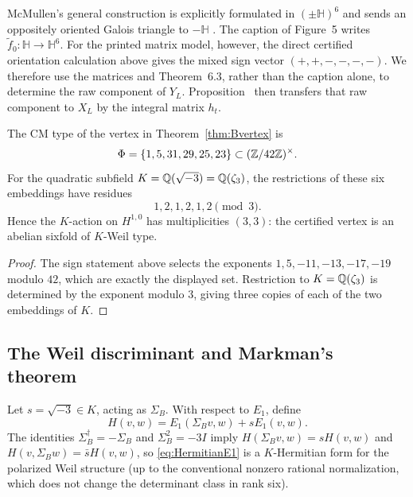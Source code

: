 \begin{remark}\label{rem:fig5signs}
McMullen's general construction is explicitly formulated in
$(\pm\mathbb H)^6$ and sends an oppositely oriented Galois triangle to
$-\mathbb H$ \cite[Thm.~6.3, Eq.~(6.1)]{McMullen2026}.  The caption of Figure~5
writes $\widetilde f_0:\mathbb H\to\mathbb H^6$.  For the printed matrix model,
however, the direct certified orientation calculation above gives the mixed sign vector
$(+,+,-,-,-,-)$.  We therefore use the matrices and Theorem~6.3, rather than the
caption alone, to determine the raw component of $Y_L$.  Proposition~
then transfers that raw component to $X_L$ by the integral matrix $h_t$.
\end{remark}

\begin{proposition}\label{prop:actualcmtype}
The CM type of the vertex in Theorem~\ref{thm:Bvertex} is
\[
 \Phi=\{1,5,31,29,25,23\}\subset (\mathbb Z/42\mathbb Z)^\times.
\]
For the quadratic subfield $K=\mathbb Q(\sqrt{-3})=\mathbb Q(\zeta_3)$, the restrictions of these six embeddings have residues
\[
 1,2,1,2,1,2\pmod 3.
\]
Hence the $K$-action on $H^{1,0}$ has multiplicities $(3,3)$: the certified vertex is an abelian sixfold of $K$-Weil type.
\end{proposition}
\begin{proof}
The sign statement above selects the exponents $1,5,-11,-13,-17,-19$ modulo $42$, which are exactly the displayed set.  Restriction to $K=\mathbb Q(\zeta_3)$ is determined by the exponent modulo $3$, giving three copies of each of the two embeddings of $K$.
\end{proof}


\subsection{The Weil discriminant and Markman's theorem}\label{sec:markman}
Let $s=\sqrt{-3}\in K$, acting as $\Sigma_B$. With respect to $E_1$, define
\begin{equation}\label{eq:HermitianE1}
 H(v,w)=E_1(\Sigma_B v,w)+sE_1(v,w).
\end{equation}
The identities $\Sigma_B^\dagger=-\Sigma_B$ and $\Sigma_B^2=-3I$ imply $H(\Sigma_B v,w)=sH(v,w)$ and $H(v,\Sigma_B w)=\bar sH(v,w)$, so \eqref{eq:HermitianE1} is a $K$-Hermitian form for the polarized Weil structure (up to the conventional nonzero rational normalization, which does not change the determinant class in rank six).

